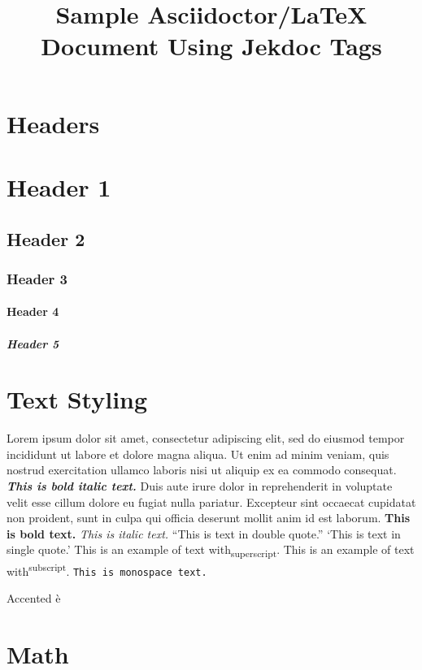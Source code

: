 \documentclass[man]{apa7}
\title{Sample Asciidoctor/LaTeX Document Using Jekdoc Tags}
\begin{document}
\maketitle

\section{Headers}

\section{Header 1}

\subsection{Header 2}

\subsubsection{Header 3}

\paragraph{Header 4}

\subparagraph{Header 5}

\section{Text Styling}

Lorem ipsum dolor sit amet, consectetur adipiscing elit, sed do eiusmod tempor incididunt ut labore et dolore magna aliqua. Ut enim ad minim veniam, quis nostrud exercitation ullamco laboris nisi ut aliquip ex ea commodo consequat. \textbf{\emph{This is bold italic text.}} Duis aute irure dolor in reprehenderit in voluptate velit esse cillum dolore eu fugiat nulla pariatur. Excepteur sint occaecat cupidatat non proident, sunt in culpa qui officia deserunt mollit anim id est laborum. \textbf{This is bold text.} \emph{This is italic text.} \enquote{This is text in double quote.} \enquote*{This is text in single quote.} This is an example of text with\textsubscript{superscript}. This is an example of text with\textsuperscript{subscript}. \texttt{This is monospace text.}

Accented \`{e}

\section{Math}
\end{document}
